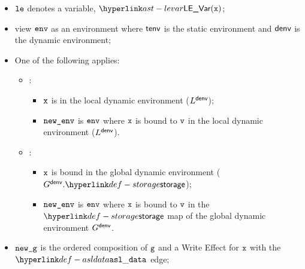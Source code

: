 \ProseParagraph
\AllApply
\begin{itemize}
    \item $\vle$ denotes a variable, $\LEVar(\vx)$;
    \item view $\env$ as an environment where $\tenv$ is the static environment and $\denv$ is the dynamic environment;
    \item One of the following applies:
    \begin{itemize}
        \item {}:
        \begin{itemize}
            \item $\vx$ is in the local dynamic environment ($L^\denv$);
            \item $\newenv$ is $\env$ where $\vx$ is bound to $\vv$ in the local dynamic environment ($L^\denv$).
        \end{itemize}

        \item {}:
        \begin{itemize}
            \item $\vx$ is bound in the global dynamic environment ($G^\denv.\storage$);
            \item $\newenv$ is $\env$ where $\vx$ is bound to $\vv$ in the $\storage$ map of the global dynamic environment $G^\denv$.
        \end{itemize}
    \end{itemize}
    \item $\newg$ is the ordered composition of $\vg$ and a Write Effect for $\vx$ with the $\asldata$ edge;
\end{itemize}

\FormallyParagraph
\begin{mathpar}
\end{mathpar}

\begin{mathpar}
\end{mathpar}

